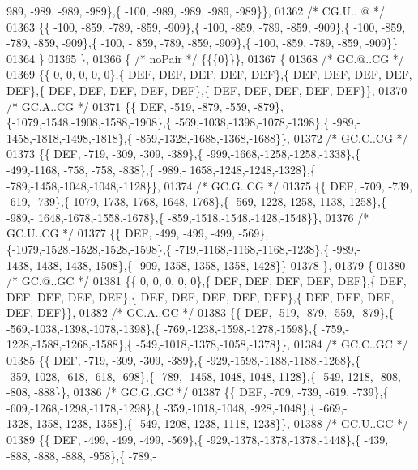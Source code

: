 \begin{DoxyCode}
      989, -989, -989, -989\},\{ -100, -989, -989, -989, -989\}\},
01362 \textcolor{comment}{/* CG.U.. @ */}
01363 \{\{ -100, -859, -789, -859, -909\},\{ -100, -859, -789, -859, -909\},\{ -100, -859, -789, -859, -909\},\{ -100, -
      859, -789, -859, -909\},\{ -100, -859, -789, -859, -909\}\}
01364 \}
01365 \},
01366 \{ \textcolor{comment}{/* noPair */} \{\{\{0\}\}\},
01367 \{
01368 \textcolor{comment}{/* GC.@..CG */}
01369 \{\{    0,    0,    0,    0,    0\},\{  DEF,  DEF,  DEF,  DEF,  DEF\},\{  DEF,  DEF,  DEF,  DEF,  DEF\},\{  DEF,  
      DEF,  DEF,  DEF,  DEF\},\{  DEF,  DEF,  DEF,  DEF,  DEF\}\},
01370 \textcolor{comment}{/* GC.A..CG */}
01371 \{\{  DEF, -519, -879, -559, -879\},\{-1079,-1548,-1908,-1588,-1908\},\{ -569,-1038,-1398,-1078,-1398\},\{ -989,-
      1458,-1818,-1498,-1818\},\{ -859,-1328,-1688,-1368,-1688\}\},
01372 \textcolor{comment}{/* GC.C..CG */}
01373 \{\{  DEF, -719, -309, -309, -389\},\{ -999,-1668,-1258,-1258,-1338\},\{ -499,-1168, -758, -758, -838\},\{ -989,-
      1658,-1248,-1248,-1328\},\{ -789,-1458,-1048,-1048,-1128\}\},
01374 \textcolor{comment}{/* GC.G..CG */}
01375 \{\{  DEF, -709, -739, -619, -739\},\{-1079,-1738,-1768,-1648,-1768\},\{ -569,-1228,-1258,-1138,-1258\},\{ -989,-
      1648,-1678,-1558,-1678\},\{ -859,-1518,-1548,-1428,-1548\}\},
01376 \textcolor{comment}{/* GC.U..CG */}
01377 \{\{  DEF, -499, -499, -499, -569\},\{-1079,-1528,-1528,-1528,-1598\},\{ -719,-1168,-1168,-1168,-1238\},\{ -989,-
      1438,-1438,-1438,-1508\},\{ -909,-1358,-1358,-1358,-1428\}\}
01378 \},
01379 \{
01380 \textcolor{comment}{/* GC.@..GC */}
01381 \{\{    0,    0,    0,    0,    0\},\{  DEF,  DEF,  DEF,  DEF,  DEF\},\{  DEF,  DEF,  DEF,  DEF,  DEF\},\{  DEF,  
      DEF,  DEF,  DEF,  DEF\},\{  DEF,  DEF,  DEF,  DEF,  DEF\}\},
01382 \textcolor{comment}{/* GC.A..GC */}
01383 \{\{  DEF, -519, -879, -559, -879\},\{ -569,-1038,-1398,-1078,-1398\},\{ -769,-1238,-1598,-1278,-1598\},\{ -759,-
      1228,-1588,-1268,-1588\},\{ -549,-1018,-1378,-1058,-1378\}\},
01384 \textcolor{comment}{/* GC.C..GC */}
01385 \{\{  DEF, -719, -309, -309, -389\},\{ -929,-1598,-1188,-1188,-1268\},\{ -359,-1028, -618, -618, -698\},\{ -789,-
      1458,-1048,-1048,-1128\},\{ -549,-1218, -808, -808, -888\}\},
01386 \textcolor{comment}{/* GC.G..GC */}
01387 \{\{  DEF, -709, -739, -619, -739\},\{ -609,-1268,-1298,-1178,-1298\},\{ -359,-1018,-1048, -928,-1048\},\{ -669,-
      1328,-1358,-1238,-1358\},\{ -549,-1208,-1238,-1118,-1238\}\},
01388 \textcolor{comment}{/* GC.U..GC */}
01389 \{\{  DEF, -499, -499, -499, -569\},\{ -929,-1378,-1378,-1378,-1448\},\{ -439, -888, -888, -888, -958\},\{ -789,-

\end{DoxyCode}
